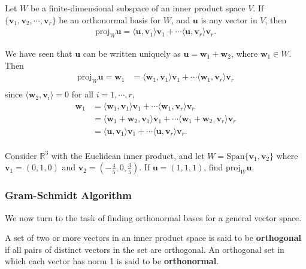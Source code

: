 \documentclass[12pt,letterpaper,reqno]{article}
\numberwithin{equation}{section}
\newcommand{\bv}{\mathbf{v}}
\newcommand{\bw}{\mathbf{w}}
\newcommand{\bu}{\mathbf{u}}
\begin{document}
\begin{prop}
Let $W$ be a finite-dimensional subspace of an inner product space $V$. If $\{\bv_1, \bv_2, \cdots, \bv_r\}$ be an orthonormal basis for $W$, and $\bu$ is any vector in $V$, then
\begin{align*}
	\text{proj}_W \bu  = \langle \bu, \bv_1 \rangle \bv_1+\cdots \langle \bu, \bv_r \rangle \bv_r.
\end{align*}	
\end{prop}

\begin{pf}
	We have seen that $\bu$ can be written uniquely as $\bu=\bw_1+\bw_2$, where $\bw_1 \in W$. Then
	\begin{align*}
		\text{proj}_W \bu  = \bw_1 &= \langle \bw_1, \bv_1 \rangle \bv_1+\cdots \langle \bw_1, \bv_r \rangle \bv_r \\
	\end{align*}
 	since $\langle \bw_2, \bv_i \rangle=0$ for all $i=1, \cdots, r$,
 	\begin{align*}
 		\bw_1 &= \langle \bw_1, \bv_1 \rangle \bv_1+\cdots \langle \bw_1, \bv_r \rangle \bv_r \\
 		&= \langle \bw_1+\bw_2, \bv_1 \rangle \bv_1+\cdots \langle \bw_1+\bw_2, \bv_r \rangle \bv_r \\ 
 		&=\langle \bu, \bv_1 \rangle \bv_1+\cdots \langle \bu, \bv_r \rangle \bv_r. \\
 	\end{align*} 
\end{pf}

\begin{exercise}
	Consider $\mathbb{R}^3$ with the Euclidean inner product, and let $W=\text{Span}\{\bv_1,\bv_2\}$ where $\bv_1=(0,1,0)$ and $\bv_2=(-\frac{4}{5},0,\frac{3}{5})$. If $\bu = (1,1,1)$, find $\text{proj}_W \bu$.
\end{exercise}

\subsubsection{Gram-Schmidt Algorithm}
We now turn to the task of finding orthonormal bases for a general vector space.
\begin{defn}
	A set of two or more vectors in an inner product space is said to be {\bf orthogonal} if all pairs of distinct vectors in the set are orthogonal. An orthogonal set in which each vector has norm 1 is said to be {\bf orthonormal}.
\end{defn}
\end{document}
